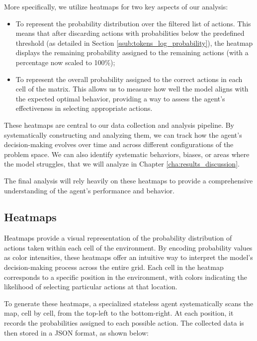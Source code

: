 More specifically, we utilize heatmaps for two key aspects of our analysis:

\begin{itemize}
  \item To represent the probability distribution over the filtered list of actions.
    This means that after discarding actions with probabilities below the
    predefined threshold (as detailed in Section \ref{ssub:tokens_log_probability}),
    the heatmap displays the remaining probability assigned to the remaining actions
    (with a percentage now scaled to 100\%);

  \item To represent the overall probability assigned to the correct actions in each
    cell of the matrix. This allows us to measure how well the model aligns with
    the expected optimal behavior, providing a way to assess the agent's effectiveness
    in selecting appropriate actions.
\end{itemize}

These heatmaps are central to our data collection and analysis pipeline. By systematically
constructing and analyzing them, we can track how the agent's decision-making
evolves over time and across different configurations of the problem space. We can
also identify systematic behaviors, biases, or areas where the model struggles,
that we will analyze in Chapter \ref{cha:results_discussion}.

The final analysis will rely heavily on these heatmaps to provide a
comprehensive understanding of the agent's performance and behavior.

\subsection{Heatmaps}

Heatmaps provide a visual representation of the probability distribution of actions
taken within each cell of the environment. By encoding probability values as
color intensities, these heatmaps offer an intuitive way to interpret the model's
decision-making process across the entire grid. Each cell in the heatmap
corresponds to a specific position in the environment, with colors indicating the
likelihood of selecting particular actions at that location.

To generate these heatmaps, a specialized stateless agent systematically scans
the map, cell by cell, from the top-left to the bottom-right. At each position,
it records the probabilities assigned to each possible action. The collected data
is then stored in a JSON format, as shown below:

